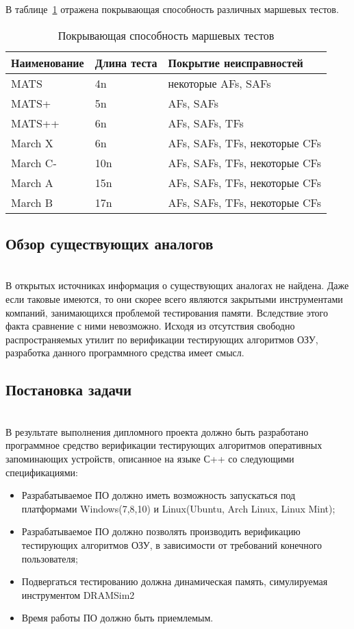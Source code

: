 В таблице~\ref{table:domain:tests:march_tests_comparison} отражена покрывающая способность различных маршевых тестов.

\begin{table}[ht]
  \caption{Покрывающая способность маршевых тестов}
  \label{table:domain:tests:march_tests_comparison}
  \begin{tabular}{| >{\centering}m{}
  				  | >{\centering}m{}
                  | >{\centering\arraybackslash}m{}|}
   \hline 
   Наименование & Длина теста & Покрытие неисправностей\\ \hline
   MATS & 4n & некоторые AFs, SAFs \\ \hline
   MATS+ & 5n & AFs, SAFs \\ \hline
   MATS++ & 6n & AFs, SAFs, TFs \\ \hline
   March X & 6n & AFs, SAFs, TFs, некоторые CFs \\ \hline
   March C- & 10n & AFs, SAFs, TFs, некоторые CFs \\ \hline
   March A &  15n & AFs, SAFs, TFs, некоторые CFs \\ \hline
   March B &  17n & AFs, SAFs, TFs, некоторые CFs \\ \hline
  \end{tabular}
\end{table}

\subsection{Обзор существующих аналогов}~\\
\label{sub:domain:analogue}
В открытых источниках информация о существующих аналогах не найдена. Даже если таковые имеются, то они скорее всего являются закрытыми инструментами компаний, занимающихся проблемой тестирования памяти. Вследствие этого факта сравнение с ними невозможно. Исходя из отсутствия свободно распространяемых утилит по верификации тестирующих алгоритмов ОЗУ, разработка данного
программного средства имеет смысл.

\subsection{Постановка задачи}~\\
\label{sub:domain:task}
В результате выполнения дипломного проекта должно быть разработано программное средство верификации тестирующих алгоритмов оперативных запоминающих устройств, описанное на языке С++ со следующими спецификациями:
\begin{itemize}
  \item Разрабатываемое ПО должно иметь возможность запускаться под платформами Windows(7,8,10) и Linux(Ubuntu, Arch Linux, Linux Mint);
  \item Разрабатываемое ПО должно позволять производить верификацию тестирующих алгоритмов ОЗУ, в зависимости от требований
конечного пользователя;
  \item Подвергаться тестированию должна динамическая память, симулируемая инструментом DRAMSim2
  \item Время работы ПО должно быть приемлемым.
\end{itemize}




